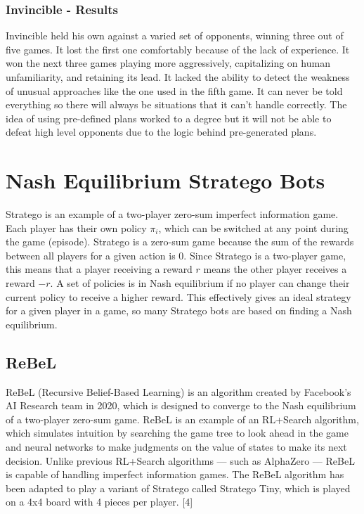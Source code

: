 \documentclass{article}
\begin{document}
\subsubsection{Invincible - Results}

Invincible held his own against a varied set of opponents, winning three out of five games. It lost the first one comfortably because of the lack of experience. 
It won the next three games playing more aggressively, capitalizing on human unfamiliarity, and retaining its lead. 
It lacked the ability to detect the weakness of unusual approaches like the one used in the fifth game. 
It can never be told everything so there will always be situations that it can’t handle correctly. 
The idea of using pre-defined plans worked to a degree but it will not be able to defeat high level opponents due to the logic behind pre-generated plans. 

\section{Nash Equilibrium Stratego Bots}

Stratego is an example of a two-player zero-sum imperfect information game. Each player has their own policy $\pi_i$, which can be switched at any point during the game (episode). Stratego is a zero-sum game because the sum of the rewards between all players for a given action is 0. Since Stratego is a two-player game, this means that a player receiving a reward $r$ means the other player receives a reward $-r$. A set of policies is in Nash equilibrium if no player can change their current policy to receive a higher reward. This effectively gives an ideal strategy for a given player in a game, so many Stratego bots are based on finding a Nash equilibrium. 

\subsection{ReBeL}

ReBeL (Recursive Belief-Based Learning) is an algorithm created by Facebook’s AI Research team in 2020, which is designed to converge to the Nash equilibrium of a two-player zero-sum game. 
ReBeL is an example of an RL+Search algorithm, which simulates intuition by searching the game tree to look ahead in the game and neural networks to make judgments on the value of states to make its next decision. 
Unlike previous RL+Search algorithms --- such as AlphaZero --- ReBeL is capable of handling imperfect information games. The ReBeL algorithm has been adapted to play a variant of Stratego called Stratego Tiny, which is played on a 4x4 board with 4 pieces per player. [4]
\end{document}
